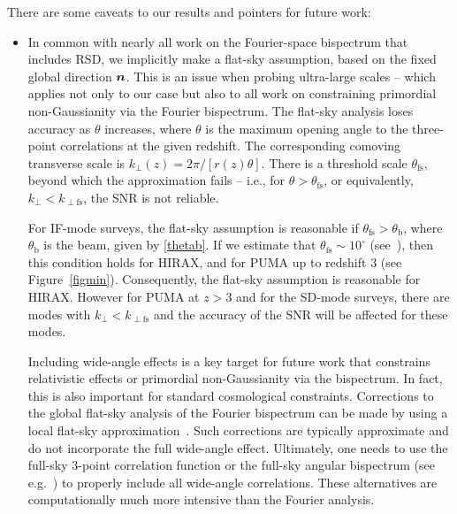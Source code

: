There are some caveats to our results and pointers for future work: 
\begin{itemize}
\item
In common with nearly all work on the Fourier-space bispectrum that includes RSD, we implicitly make a flat-sky assumption, based on the fixed global direction $\bm {n}$. This is an issue when probing ultra-large scales -- which applies not only to our case but also to all work on constraining primordial non-Gaussianity via the Fourier bispectrum. 
The flat-sky analysis loses accuracy as $\theta$ increases, where $\theta$ is the maximum opening angle to the three-point correlations at the given redshift. The corresponding comoving transverse scale is $k_\perp(z) = 2\pi/\left[r(z) \theta\right]$. There is a threshold scale  
$\theta_\mathrm{fs}$, beyond which the  approximation fails -- i.e., for $\theta> \theta_\mathrm{fs}$, or equivalently, $k_\perp < k_{\perp \mathrm{fs}}$, the SNR is not reliable.

For IF-mode surveys, the flat-sky assumption is reasonable if $\theta_\mathrm{fs}> \theta_\mathrm{b}$, where $\theta_\mathrm{b}$ is the beam, given by \eqref{thetab}. If we estimate that $\theta_\mathrm{fs} \sim 10^\circ$ (see~\cite{Matsubara:1999du}), then this condition holds for HIRAX, and for PUMA up to redshift 3 (see Figure~\ref{figmin}).
Consequently, the flat-sky assumption is reasonable for HIRAX. However for PUMA at $z>3$ and for the SD-mode surveys, there are modes with $k_\perp < k_{\perp \mathrm{fs}}$ and the accuracy of the SNR will be affected for these modes.

Including wide-angle effects is a key target for future work that constrains relativistic effects or primordial non-Gaussianity via the bispectrum. In fact, this is also important for standard cosmological constraints.
Corrections to the global flat-sky analysis of the Fourier bispectrum can be made by using a local flat-sky approximation~\cite{Scoccimarro:2015bla,Sugiyama:2018yzo}.
Such corrections are typically approximate and do not incorporate the full wide-angle effect. Ultimately, one needs to use the full-sky 3-point correlation function or the full-sky angular bispectrum (see e.g.~\cite{Kehagias:2015tda, DiDio:2016gpd, DiDio:2018unb, Durrer:2020orn}) to properly include all wide-angle correlations. These alternatives are computationally much more intensive than the Fourier analysis.


\end{itemize}
